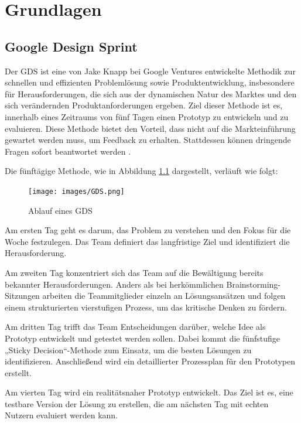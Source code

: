 \chapter{Grundlagen}

\section{Google Design Sprint}

Der \ac{GDS} ist eine von Jake Knapp bei Google Ventures entwickelte Methodik zur schnellen und effizienten Problemlösung sowie Produktentwicklung, insbesondere für Herausforderungen, die sich aus der dynamischen Natur des Marktes und den sich verändernden Produktanforderungen ergeben. 
Ziel dieser Methode ist es, innerhalb eines Zeitraums von fünf Tagen einen Prototyp zu entwickeln und zu evaluieren. 
Diese Methode bietet den Vorteil, dass nicht auf die Markteinführung gewartet werden muss, um Feedback zu erhalten. Stattdessen können dringende Fragen sofort beantwortet werden \cite[S.98 f.]{Design_Sprint}.

Die fünftägige Methode, wie in Abbildung \ref{GDS} dargestellt, verläuft wie folgt:

\begin{figure}[h]
    \centering
    \texttt{[image: images/GDS.png]}
    \caption[Ablauf eines GDS]{Ablauf eines GDS \cite{GDS_Abbildung}}
    \label{GDS}
\end{figure}

Am ersten Tag geht es darum, das Problem zu verstehen und den Fokus für die Woche festzulegen. Das Team definiert das langfristige Ziel und identifiziert die Herausforderung. 

Am zweiten Tag konzentriert sich das Team auf die Bewältigung bereits bekannter Herausforderungen. Anders als bei herkömmlichen Brainstorming-Sitzungen arbeiten die Teammitglieder einzeln an Lösungsansätzen und folgen einem strukturierten vierstufigen Prozess, um das kritische Denken zu fördern. 

Am dritten Tag trifft das Team Entscheidungen darüber, welche Idee als Prototyp entwickelt und getestet werden sollen. Dabei kommt die fünfstufige „Sticky Decision“-Methode zum Einsatz, um die besten Lösungen zu identifizieren. Anschließend wird ein detaillierter Prozessplan für den Prototypen erstellt. 

Am vierten Tag wird ein realitätsnaher Prototyp entwickelt. Das Ziel ist es, eine testbare Version der Lösung zu erstellen, die am nächsten Tag mit echten Nutzern evaluiert werden kann. 

